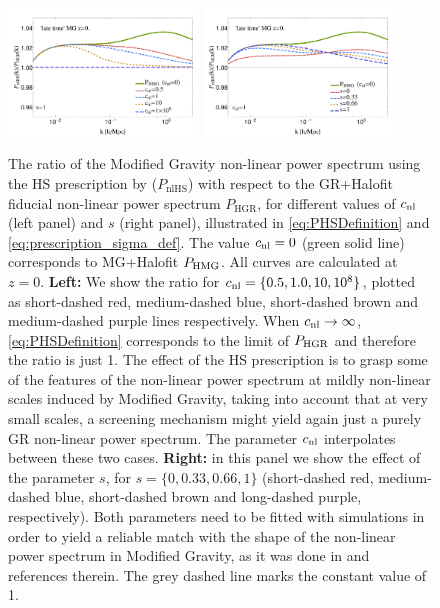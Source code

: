 \begin{figure}[htbp]
\begin{centering}
\includegraphics[width=0.45\textwidth]{Chapters/linear-nonlinear-MG-forecasts/figures/power-spectra/pk-Ratios-ZhaovsGRNL-MGDE2nonuhs-z_0p-zind_1}
\includegraphics[width=0.45\textwidth]{Chapters/linear-nonlinear-MG-forecasts/figures/power-spectra/pk-Ratios-Zhao_SigmaExp-vsGRNL-MGDE2nonuhs-z_0p-zind_1} 
\end{centering}
\caption[Effect of the non-linear Hu\&\ Sawicki prescription]{\label{fig:lin-nonlin-Zhao-MG} The ratio of the Modified Gravity non-linear
power spectrum using the HS prescription by \cite{hu_parameterized_2007}
($P_{\mathrm{nlHS}}$) with respect to the GR+Halofit fiducial non-linear power spectrum $P_{\mathrm{HGR}}$, 
for different values of $c_{\mathrm{nl}}$ (left panel) and $s$ (right panel),
illustrated in \cref{eq:PHSDefinition} and \cref{eq:prescription_sigma_def}.
The value $c_{\mathrm{nl}}=0$ (green solid line) corresponds
to MG+Halofit $P_{\mathrm{HMG}}$.
All curves are calculated at $z=0$.
\textbf{Left: } We show the ratio for $c_{\mathrm{nl}}=\{0.5,1.0,10,10^8\}$,
plotted as short-dashed red, medium-dashed blue, short-dashed brown and medium-dashed purple
lines respectively. When $c_{\mathrm{nl}}\rightarrow\infty$, \cref{eq:PHSDefinition}
corresponds to the limit of $P_{\mathrm{HGR}}$ and therefore the ratio is
just 1. The effect of the HS prescription
is to grasp some of the features of the non-linear power spectrum
at mildly non-linear scales induced by Modified Gravity, taking into
account that at very small scales, a screening mechanism might yield
again just a purely GR non-linear power spectrum. The parameter $c_{\mathrm{nl}}$
interpolates between these two cases. \textbf{Right: }in this panel
we show the effect of the parameter $s$, for $s=\{0,0.33,0.66,1\}$
(short-dashed red, medium-dashed blue, short-dashed brown and long-dashed
purple, respectively). Both parameters need to be fitted with simulations
in order to yield a reliable match with the shape of the non-linear
power spectrum in Modified Gravity, as it was done in \cite{zhao_n-body_2011}
and references therein. The grey dashed line marks the constant value of 1.}
\end{figure}



